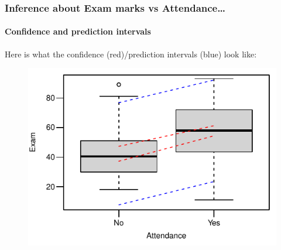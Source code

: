 \documentclass{beamer}\usepackage[]{graphicx}\usepackage[]{xcolor}
\begin{document}
\begin{frame}[fragile]
\frametitle{Inference about Exam marks vs Attendance\ldots}
\framesubtitle{Confidence and prediction intervals}

Here is what the confidence (red)/prediction intervals (blue) look like:


\begin{figure}
  \centering
  \includegraphics{figure/RC-H05-030}
\end{figure}

\end{frame}


\end{document}
